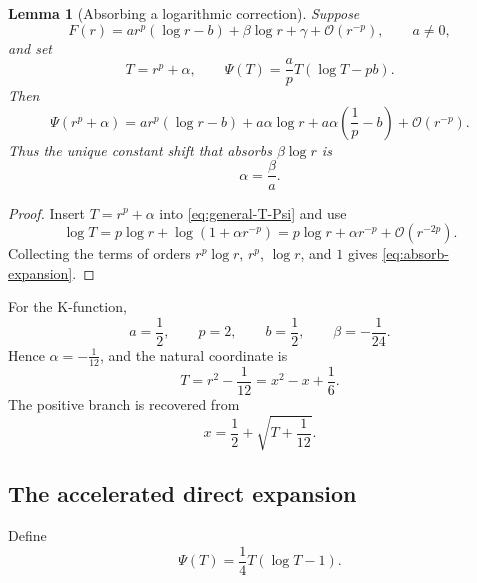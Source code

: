 \documentclass[11pt,a4paper]{article}
\numberwithin{equation}{section}
\newtheorem{lemma}[theorem]{Lemma}
\theoremstyle{remark}
\newcommand{\bigO}{\mathcal O}
\begin{document}
\begin{lemma}[Absorbing a logarithmic correction]
\label{lem:absorb-log}
Suppose
\begin{equation}
F(r)=a r^p(\log r-b)+\beta\log r+\gamma+\bigO(r^{-p}),
\qquad a\ne0,
\label{eq:absorb-assumption}
\end{equation}
and set
\begin{equation}
T=r^p+\alpha,
\qquad
\Psi(T)=\frac{a}{p}T(\log T-pb).
\label{eq:general-T-Psi}
\end{equation}
Then
\begin{equation}
\Psi(r^p+\alpha)
=a r^p(\log r-b)+a\alpha\log r
+a\alpha\left(\frac1p-b\right)+\bigO(r^{-p}).
\label{eq:absorb-expansion}
\end{equation}
Thus the unique constant shift that absorbs \(\beta\log r\) is
\begin{equation}
\alpha=\frac{\beta}{a}.
\label{eq:alpha-general}
\end{equation}
\end{lemma}

\begin{proof}
Insert \(T=r^p+\alpha\) into \cref{eq:general-T-Psi} and use
\[
\log T=p\log r+\log(1+\alpha r^{-p})
=p\log r+\alpha r^{-p}+\bigO(r^{-2p}).
\]
Collecting the terms of orders \(r^p\log r\), \(r^p\), \(\log r\), and
\(1\) gives \cref{eq:absorb-expansion}.
\end{proof}

For the K-function,
\[
a=\frac12,
\qquad p=2,
\qquad b=\frac12,
\qquad \beta=-\frac1{24}.
\]
Hence \(\alpha=-\tfrac1{12}\), and the natural coordinate is
\begin{equation}
T=r^2-\frac1{12}=x^2-x+\frac16.
\label{eq:T-K}
\end{equation}
The positive branch is recovered from
\begin{equation}
x=\frac12+\sqrt{T+\frac1{12}}.
\label{eq:x-from-T}
\end{equation}

\subsection{The accelerated direct expansion}

Define
\begin{equation}
\Psi(T)=\frac14T(\log T-1).
\label{eq:Psi-K}
\end{equation}
\end{document}
